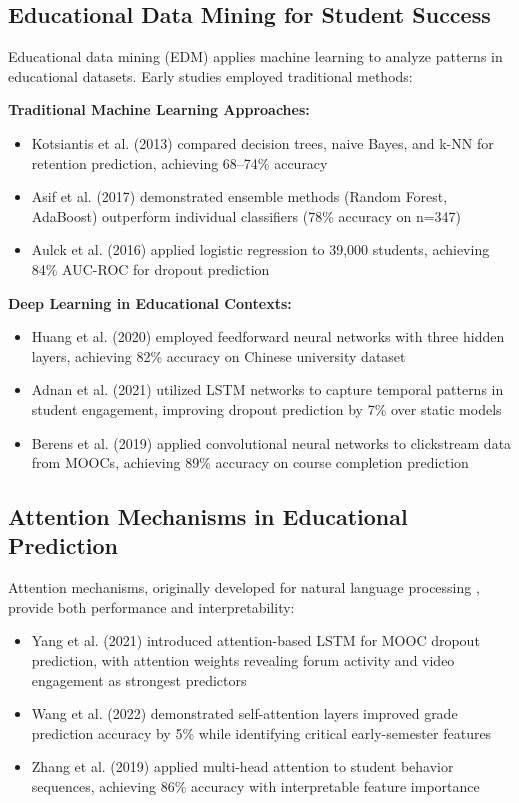 \subsection{Educational Data Mining for Student Success}

Educational data mining (EDM) applies machine learning to analyze patterns in educational datasets. Early studies employed traditional methods:

\textbf{Traditional Machine Learning Approaches:}
\begin{itemize}
\item Kotsiantis et al. (2013) compared decision trees, naive Bayes, and k-NN for retention prediction, achieving 68--74\% accuracy
\item Asif et al. (2017) demonstrated ensemble methods (Random Forest, AdaBoost) outperform individual classifiers (78\% accuracy on n=347)
\item Aulck et al. (2016) applied logistic regression to 39,000 students, achieving 84\% AUC-ROC for dropout prediction
\end{itemize}

\textbf{Deep Learning in Educational Contexts:}
\begin{itemize}
\item Huang et al. (2020) employed feedforward neural networks with three hidden layers, achieving 82\% accuracy on Chinese university dataset
\item Adnan et al. (2021) utilized LSTM networks to capture temporal patterns in student engagement, improving dropout prediction by 7\% over static models
\item Berens et al. (2019) applied convolutional neural networks to clickstream data from MOOCs, achieving 89\% accuracy on course completion prediction
\end{itemize}

\subsection{Attention Mechanisms in Educational Prediction}

Attention mechanisms, originally developed for natural language processing \cite{Vaswani2017}, provide both performance and interpretability:

\begin{itemize}
\item Yang et al. (2021) introduced attention-based LSTM for MOOC dropout prediction, with attention weights revealing forum activity and video engagement as strongest predictors
\item Wang et al. (2022) demonstrated self-attention layers improved grade prediction accuracy by 5\% while identifying critical early-semester features
\item Zhang et al. (2019) applied multi-head attention to student behavior sequences, achieving 86\% accuracy with interpretable feature importance
\end{itemize}

